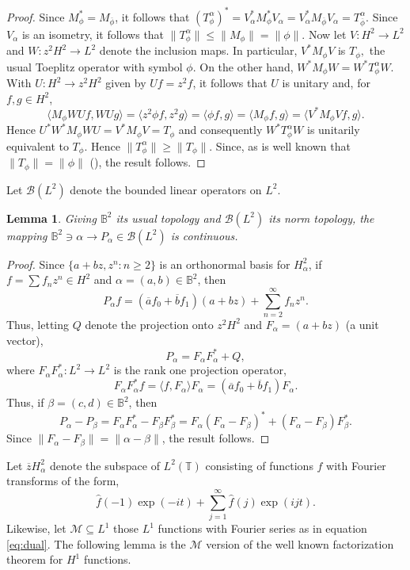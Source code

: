 \documentclass[12pt]{amsart}
\newtheorem{lemma}[theorem]{Lemma}
\theoremstyle{definition}
\theoremstyle{remark}
\numberwithin{equation}{section}
\begin{document}
\begin{proof}
Since $M_{\phi}^* = M_{\overline{\phi}}$, it follows that $(T^\alpha_\phi)^* = V_{\alpha}^* M_{\phi}^* V_{\alpha} = V_{\alpha}^* M_{\overline{\phi}} V_{\alpha} =  T^\alpha_{\overline{\phi}}.$
Since $V_{\alpha}$ is an isometry, it follows that $\|T^\alpha_\phi\| \le \|M_{\phi}\| = \|\phi\|.$  Now let $V:H^2\to L^2$ and $W:z^2 H^2\to L^2$ denote the inclusion maps.
In particular, $V^*M_\phi V$ is $T_\phi,$ the usual Toeplitz operator with symbol $\phi$.  On the other hand,
$W^*M_\phi W = W^* T^\alpha_\phi W$.  With $U:H^2\to z^2 H^2$ given by $Uf=z^2f$, it follows that $U$ is unitary and, for $f,g\in H^2$,
\[
 \langle M_\phi WUf,WUg\rangle = \langle z^2\phi f,z^2 g\rangle = \langle \phi f,g\rangle = \langle  M_\phi f,g\rangle =\langle V^* M_\phi Vf,g\rangle.
\]
Hence $U^* W^* M_\phi W U = V^* M_\phi V=T_\phi$ and consequently $W^* T^\alpha_\phi W$ is unitarily equivalent to $T_\phi$.  Hence $\|T^\alpha_\phi\|\ge \|T_\phi\|$. Since,  as is well known  that $\|T_\phi\|=\|\phi\|$ (\cite{M-AR}), the result follows.
\end{proof}

Let $\mathscr{B}(L^2)$ denote the bounded linear operators on $L^2.$ 

\begin{lemma}
\label{lem:Pcont}
Giving ${\mathbb{B}^2}$ its usual topology and $\mathscr{B}(L^2)$ its norm topology, the mapping ${\mathbb{B}^2} \ni \alpha \to P_\alpha\in \mathscr{B}(L^2)$ is continuous.
\end{lemma}

\begin{proof}
Since $\{a+bz,z^n:n\ge 2\}$ is an orthonormal basis for $H^2_\alpha$, if 
 $f=\sum f_nz^n \in H^2$ and $\alpha =(a,b)\in {\mathbb{B}^2}$, then
\[
 P_\alpha f = (\overline{a}f_0 + \overline{b}f_1)(a+bz) + \sum_{n=2}^\infty f_n z^n.
\]
Thus, letting $Q$ denote the projection onto $z^2 H^2$ and $F_\alpha = (a+bz)$ (a unit vector),
\[
 P_\alpha = F_\alpha F_\alpha^* + Q,
\]
 where $F_\alpha F_\alpha^*:L^2\to L^2$ is the rank one projection operator,
\[
 F_\alpha F_\alpha^* f = \langle f,F_\alpha\rangle F_\alpha = (\overline{a} f_0 +\overline{b} f_1) F_\alpha.
\]
Thus, if $\beta=(c,d)\in {\mathbb{B}^2}$, then 
\[
 P_\alpha -P_\beta = F_\alpha F_\alpha^* - F_\beta F_\beta^* = F_\alpha(F_\alpha-F_\beta)^* + (F_\alpha-F_\beta)F_\beta^*.
\]
Since $\|F_\alpha -F_\beta\| = \|\alpha -\beta\|$, the result follows.
\end{proof}

Let $\overline{z}H^2_\alpha$ denote the subspace of $L^2(\mathbb T)$ consisting of functions $f$ with Fourier transforms of the form,
\begin{equation}
\label{eq:dual}
  \hat{f}(-1)\exp(-it) +\sum_{j=1}^\infty \hat{f}(j) \exp(ijt).
\end{equation}
Likewise, let $\mathscr{M}{\subseteq} L^1$ those $L^1$ functions with Fourier series as in equation \eqref{eq:dual}. 
The following lemma is the $\mathscr{M}$ version of the well known factorization theorem for $H^1$ functions.
\end{document}

